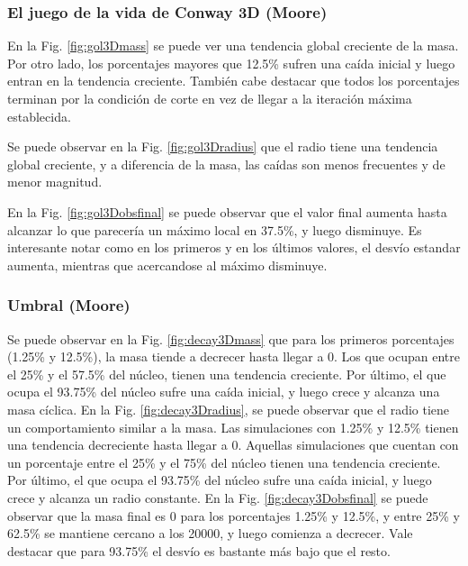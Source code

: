 \subsubsection{El juego de la vida de Conway 3D (Moore)}
En la Fig. \ref{fig:gol3Dmass} se puede ver una tendencia global creciente de la masa.
Por otro lado, los porcentajes mayores que 12.5\% sufren una caída inicial y luego entran en la tendencia creciente.
También cabe destacar que todos los porcentajes terminan por la condición de corte en vez de llegar a la iteración máxima establecida.

Se puede observar en la Fig. \ref{fig:gol3Dradius} que el radio tiene una tendencia global creciente, y a diferencia de la masa, las caídas son menos frecuentes y de menor magnitud.

En la Fig. \ref{fig:gol3Dobsfinal} se puede observar que el valor final aumenta hasta alcanzar lo que parecería un máximo local en 37.5\%, y luego disminuye.
Es interesante notar como en los primeros y en los últimos valores, el desvío estandar aumenta, mientras que acercandose al máximo disminuye.


\subsubsection{Umbral (Moore)}
Se puede observar en la Fig. \ref{fig:decay3Dmass} que para los primeros porcentajes (1.25\% y 12.5\%), la masa tiende a decrecer hasta llegar a $0$.
Los que ocupan entre el 25\% y el 57.5\% del núcleo, tienen una tendencia creciente.
Por último, el que ocupa el 93.75\% del núcleo sufre una caída inicial, y luego crece y alcanza una masa cíclica.
En la Fig. \ref{fig:decay3Dradius}, se puede observar que el radio tiene un comportamiento similar a la masa.
Las simulaciones con 1.25\% y 12.5\% tienen una tendencia decreciente hasta llegar a $0$.
Aquellas simulaciones que cuentan con un porcentaje entre el 25\% y el 75\% del núcleo tienen una tendencia creciente.
Por último, el que ocupa el 93.75\% del núcleo sufre una caída inicial, y luego crece y alcanza un radio constante.
En la Fig. \ref{fig:decay3Dobsfinal} se puede observar que la masa final es 0 para los porcentajes 1.25\% y 12.5\%, y entre 25\% y 62.5\% se mantiene cercano a los 20000, y luego comienza a decrecer. Vale destacar que para 93.75\% el desvío es bastante más bajo que el resto.

